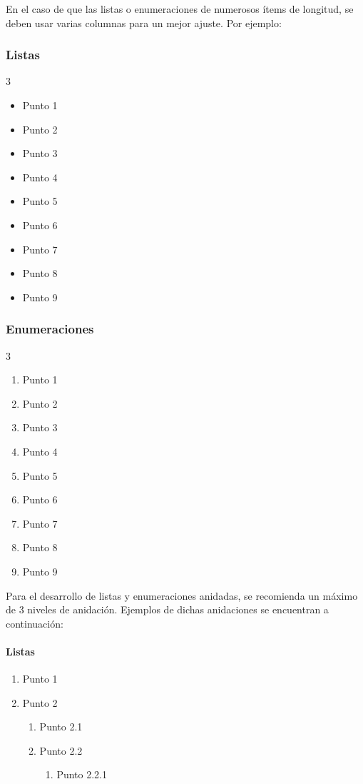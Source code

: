 \documentclass{aleph-revista}
\begin{document}
En el caso de que las listas o enumeraciones de numerosos ítems de longitud, se deben usar varias columnas para un mejor ajuste. Por ejemplo:

\subsubsection{Listas} 

\begin{multicols}{3}
\begin{itemize} 
    \item Punto 1
    \item Punto 2
    \item Punto 3
    \item Punto 4
    \item Punto 5
    \item Punto 6
    \item Punto 7
    \item Punto 8
    \item Punto 9
\end{itemize}
\end{multicols}

\subsubsection{Enumeraciones}
\begin{multicols}{3}
\begin{enumerate} 
    \item Punto 1
    \item Punto 2
    \item Punto 3
    \item Punto 4
    \item Punto 5
    \item Punto 6
    \item Punto 7
    \item Punto 8
    \item Punto 9
\end{enumerate}
\end{multicols}

Para el desarrollo de listas y enumeraciones anidadas, se recomienda un máximo de 3 niveles de anidación. Ejemplos de dichas anidaciones se encuentran a continuación:

\paragraph{Listas}
\begin{enumerate}
    \item Punto 1
    \item Punto 2 \begin{enumerate}
        \item Punto 2.1
        \item Punto 2.2 \begin{enumerate}
            \item Punto 2.2.1
        \end{enumerate}
    \end{enumerate}
\end{enumerate}
\end{document}
